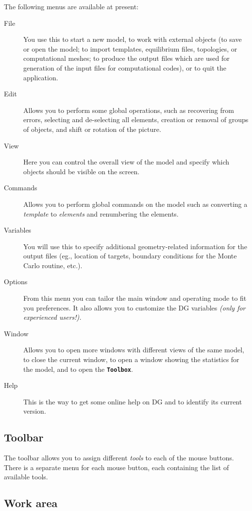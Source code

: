 \documentclass[12pt]{report}
\begin{document}
The following menus are available at present:

\begin{description}
  \item[File] You use this to start a new model, to work with
external objects (to save or open the model; to import templates,
equilibrium files, topologies, 
or computational meshes; to produce the output files
which are used for generation of the input files for computational
codes), or to quit the application.
  \item[Edit] Allows you to perform some global operations,
such as recovering from errors, selecting and de-selecting all
elements, creation or removal of groups of objects, and shift or
rotation of the picture.
  \item[View] Here you can control the overall view of the
model and specify which objects should be
visible on the screen.
  \item[Commands] Allows you to perform global commands on
the model such as converting 
a \textit{template} to \textit{elements} and 
renumbering the elements.
  \item[Variables] You will use this to specify
additional geometry-related information for the output files (eg.,
location of targets, boundary conditions for the Monte Carlo routine,
etc.).
  \item[Options] From this menu you can tailor the main window
and operating mode
to fit you preferences. It also allows you to customize the DG
variables \textit{(only for experienced users!).}
  \item[Window] Allows you to open more windows with
different views of the same model, to close the current window, to open
a window showing the statistics for the model, and to open the
\textbf{\texttt{Toolbox}}.
  \item[Help] This is the way to get some online help on DG and
to identify its current version.
\end{description}

\subsection{Toolbar}

The toolbar allows you to assign different \textit{tools} to each of
the mouse buttons. There is a separate menu for each
mouse button, each containing 
the list of available tools.

\subsection{Work area}
\end{document}
